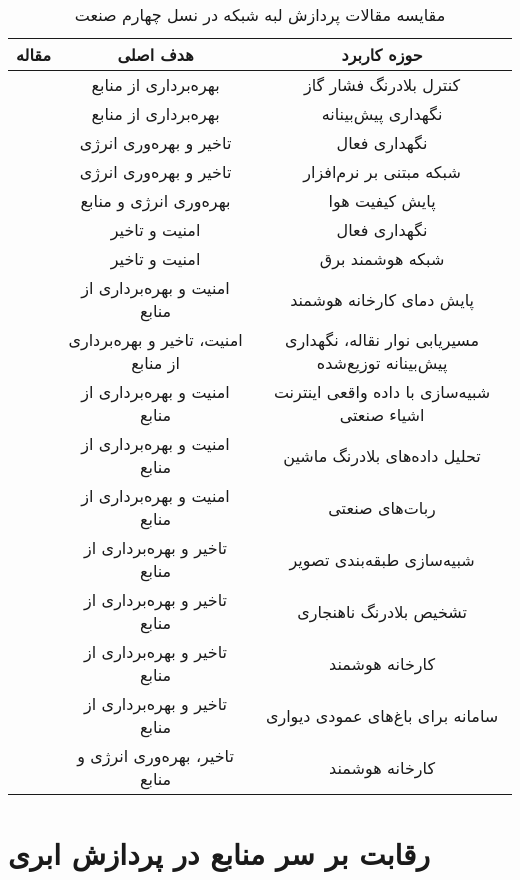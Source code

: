 \begin{table}[t]
\center
\caption{مقایسه مقالات پردازش لبه شبکه در نسل چهارم صنعت}
\begin{tabular}{|c|c|c|}
\hline
مقاله & هدف اصلی & حوزه کاربرد\\
\hline
\hline
\cite{vakili2019open} & بهره‌برداری از منابع & کنترل بلادرنگ فشار گاز\\ 
\cite{oyekanlu2017predictive} & بهره‌برداری از منابع & نگهداری پیش‌بینانه \\
\cite{chalapathi2021iioT} & تاخیر و بهره‌وری انرژی & نگهداری فعال \\
\cite{kaur2018edge} & تاخیر و بهره‌وری انرژی & شبکه مبتنی بر نرم‌افزار \\
\cite{kristiani2021cloudedge} & بهره‌وری انرژی و منابع & پایش کیفیت هوا\\
\cite{chen2018edge} & امنیت و تاخیر & نگهداری فعال \\
\cite{okay2016fog} & امنیت و تاخیر & شبکه هوشمند برق\\
\cite{fu2018secure} & امنیت و بهره‌برداری از منابع & پایش دمای کارخانه هوشمند\\
\cite{pop2021fora} & امنیت، تاخیر و بهره‌برداری از منابع & مسیریابی نوار نقاله، نگهداری پیش‌بینانه توزیع‌شده\\
\cite{chekired2018industrial} & امنیت و بهره‌برداری از منابع & شبیه‌سازی با داده واقعی اینترنت اشیاء صنعتی\\
\cite{denzler2020consolidating} & امنیت و بهره‌برداری از منابع & تحلیل داده‌های بلادرنگ ماشین\\
\cite{shaik2020fog} & امنیت و بهره‌برداری از منابع & ربات‌های صنعتی\\
\cite{liang2020edge} & تاخیر و بهره‌برداری از منابع & شبیه‌سازی طبقه‌بندی تصویر\\
\cite{Ferrari2019Anomaly} & تاخیر و بهره‌برداری از منابع & تشخیص بلادرنگ ناهنجاری\\
\cite{Lee2020SmartMfg} & تاخیر و بهره‌برداری از منابع & کارخانه هوشمند\\
\cite{liu2021performance} & تاخیر و بهره‌برداری از منابع & سامانه برای باغ‌های عمودی دیواری\\
\cite{li2018adaptive} & تاخیر، بهره‌وری انرژی و منابع & کارخانه هوشمند\\
\hline
\end{tabular}
\label{table:litr_rev_industry}
\end{table}

\section{رقابت بر سر منابع در پردازش ابری}

